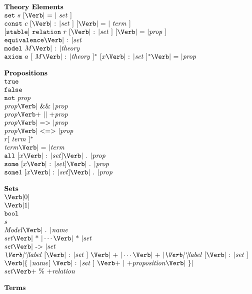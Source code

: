 \begin{figure}
\[
\begin{array}{l}
\mbox{\textbf{Theory Elements}}\\
\SET\ s\ [\EQUALS\ \mathit{set}\ ]\\
\CONST\ c\ [\COLON \mathit{set}\ ]\ [\EQUALS\ \mathit{term}\ ]\\
{}[\STABLE{}]\ \RELATION\ r\ [\COLON \mathit{set}\ ]\ [\EQUALS \mathit{prop}\ ]\\
\EQUIVALENCE \COLON \mathit{set}\\
\MODEL\ M\COLON\mathit{theory}\\
\AXIOM\ a\ [\ M\COLON\mathit{theory}\ ]^{*}\ [x\COLON\mathit{set}\ ]^*\EQUALS\mathit{prop}\\
\\
\mbox{\textbf{Propositions}}\\
\TRUE\\
\FALSE\\
\NOT\ \Prop\\
\Prop \AAND \Prop\\
\Prop \OOR \Prop\\
\Prop \IIMPLY \Prop\\
\Prop \IIFF \Prop\\
r [\ \Term\ ]^*\\
\Term\EQUALS\Term\\ %
\ALL\ [x\COLON \Set] \PERIOD \Prop\\
\SOME\ [x\COLON \Set] \PERIOD \Prop\\
\SOME1\ [x\COLON \Set] \PERIOD \Prop\\
\\
\mbox{\textbf{Sets}}\\
\ZERO\\
\ONE\\
\BOOL\\
s\\
\mathit{Model}\PERIOD \mathit{name}\\
\Set \TIMES \cdots \TIMES \Set\\
\Setexp \ARROW \Setexp\\
\Label\ [\COLON \Setexp\ ]\ \PLUS \cdots \PLUS \Label\ [\COLON \Setexp\ ]\\
\LBRACE \Ident [\ \COLON \Setexp\ ]\ \BAR \Proposition \RBRACE\\
\Setexp \PERCENT \metav{relation}\\
\\
\mbox{\textbf{Terms}}\\

\end{array}\]
\end{figure}
